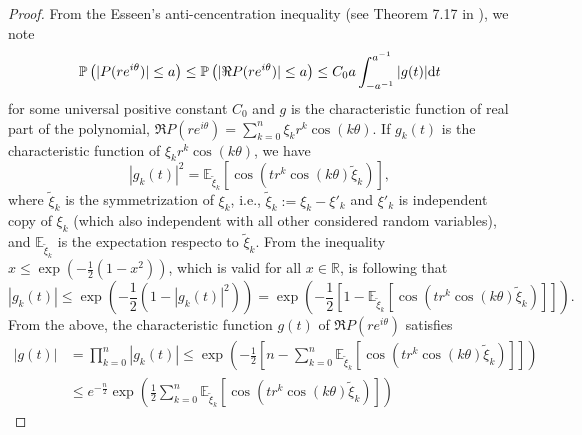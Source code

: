 \documentclass[12pt]{amsart}
\theoremstyle{plain}
\numberwithin{equation}{section}
\newcommand{\<}{\langle}
\renewcommand{\>}{\rangle}
\newcommand{\PP}[1]{\left(#1\right)}
\newcommand{\CC}[1]{\left[#1\right]}
\newcommand{\R}{\mathds{R}}
\newcommand{\dd}{\textnormal{d}}
\newcommand{\abs}[1]{\left|#1\right|}
\begin{document}
\begin{proof}
From the Esseen's anti-cencentration inequality (see Theorem 7.17 in \cite{tao2006additive}), we note
\begin{equation}\label{eq:esseen}
\mathbb{P}\left( |P(re^{i\theta})| \leq a\right) \leq \mathbb{P}\left( |\Re P(re^{i\theta})| \leq a \right) \leq C_0 a\int_{-a^{-1}}^{a^{-1}} |g(t)| \dd t
\end{equation}
for some universal positive constant $C_0$ and $g$ is the characteristic function of  real part of the polynomial, $\Re P(re^{i\theta}) = \sum_{k=0}^{n} \xi_k r^k\cos(k\theta)$. If $g_k(t)$ is the characteristic function of $\xi_k r^k \cos(k\theta)$, we have 
\[
\abs{g_k(t)}^2 = \mathbb{E}_{\tilde{\xi}_k}\CC{ \cos\PP{ t r^k \cos(k\theta) \tilde{\xi}_k}},
\]
where $\tilde{\xi}_k$ is the symmetrization of $\xi_k$, i.e., $\tilde{\xi}_k:=\xi_k - \xi'_k$ and $\xi'_k$ is independent copy of $\xi_k$ (which also independent with all other considered random variables), and $ \mathbb{E}_{\tilde{\xi}_k}$ is the expectation respecto to $\tilde{\xi}_k$. From the inequality $x \leq \exp\PP{ -\frac{1}{2}(1-x^2) }$, which is valid for all $x\in\R$, is following that
\[
\abs{g_k(t)} \leq \exp\PP{ -\frac{1}{2}( 1 - \abs{g_k(t)}^2 ) }  = \exp\PP{ -\frac{1}{2}\CC{ 1 - \mathbb{E}_{\tilde{\xi}_k}\CC{ \cos\PP{ t r^k \cos(k\theta) \tilde{\xi}_k}} } }.
\]
From the above, the characteristic function $g(t)$ of $\Re P(re^{i\theta})$ satisfies
\begin{align}
\abs{g(t)} & = \prod_{k=0}^{n} \abs{g_k(t)} \leq \exp\PP{ -\frac{1}{2} \CC{ n - \sum_{k=0}^n \mathbb{E}_{\tilde{\xi}_k}\CC{ \cos\PP{ t r^k\cos(k\theta) \tilde{\xi}_k } } } } \nonumber \\
& \leq e^{-\frac{n}{2}} \exp\PP{ \frac{1}{2}\sum_{k=0}^n \mathbb{E}_{\tilde{\xi}_k}\CC{ \cos\PP{t r^k \cos(k\theta) \tilde{\xi}_k } } } \label{eqn:chafun}
\end{align}


\end{proof}
\end{document}
